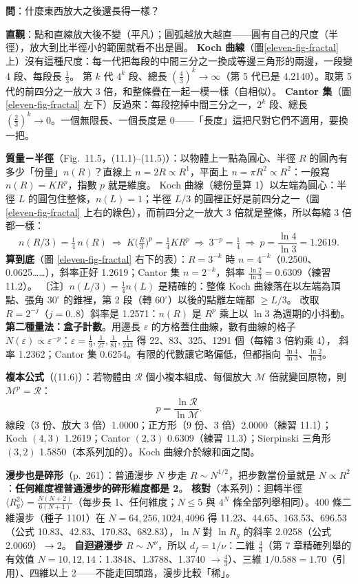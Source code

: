 \textbf{問}：什麼東西放大之後還長得一樣？

\textbf{直觀}：點和直線放大後不變（平凡）；圓弧越放大越直——圓有自己的尺度（半徑），放大到比半徑小的範圍就看不出是圓。
\textbf{Koch 曲線}（圖\ref{eleven-fig-fractal} 上）沒有這種尺度：每一代把每段的中間三分之一換成等邊三角形的兩邊，一段變 4 段、每段長 $\frac13$。
第 $k$ 代 $4^k$ 段、總長 $(\frac43)^k\to\infty$（第 5 代已是 4.2140）。取第 5 代的前四分之一放大 3 倍，和整條疊在一起一模一樣（自相似）。
\textbf{Cantor 集}（圖\ref{eleven-fig-fractal} 左下）反過來：每段挖掉中間三分之一，$2^k$ 段、總長 $(\frac23)^k\to0$。一個無限長、一個長度是 0——「長度」這把尺對它們不適用，要換一把。

\textbf{質量－半徑}（Fig.~11.5，(11.1)--(11.5)）：以物體上一點為圓心、半徑 $R$ 的圓內有多少「份量」$n(R)$？直線上 $n=2R\propto R^1$，平面上 $n=\pi R^2\propto R^2$：一般寫 $n(R)=KR^p$，指數 $p$ 就是維度。
Koch 曲線（總份量算 1）以左端為圓心：半徑 $L$ 的圓包住整條，$n(L)=1$；半徑 $L/3$ 的圓裡正好是前四分之一（圖 \ref{eleven-fig-fractal} 上右的綠色），而前四分之一放大 3 倍就是整條，所以每縮 3 倍都一樣：
\[n(R/3)=\tfrac14\,n(R)\ \Rightarrow\ K\big(\tfrac R3\big)^p=\tfrac14KR^p\ \Rightarrow\ 3^{-p}=\tfrac14\ \Rightarrow\ p=\frac{\ln4}{\ln3}=1.2619 .\tag{11.1--11.5}\]
\textbf{算到底}（圖 \ref{eleven-fig-fractal} 右下的表）：$R=3^{-k}$ 時 $n=4^{-k}$（0.2500、0.0625……），斜率正好 1.2619；Cantor 集 $n=2^{-k}$，斜率 $\frac{\ln2}{\ln3}=0.6309$（練習 11.2）。
〔注〕$n(L/3)=\frac14n(L)$ 是精確的：整條 Koch 曲線落在以左端為頂點、張角 $30^\circ$ 的錐裡，第 2 段（轉 $60^\circ$）以後的點離左端都 $\ge L/3$。
改取 $R=2^{-j}$（$j=0..8$）斜率是 1.2571：$n(R)$ 是 $R^p$ 乘上以 $\ln3$ 為週期的小抖動。
\textbf{第二種量法：盒子計數}。用邊長 $\varepsilon$ 的方格蓋住曲線，數有曲線的格子 $N(\varepsilon)\propto\varepsilon^{-p}$：$\varepsilon=\frac19,\frac1{27},\frac1{81},\frac1{243}$ 得 22、83、325、1291 個（每縮 3 倍約乘 4），
斜率 1.2362；Cantor 集 0.6254。有限的代數讓它略偏低，但都指向 $\frac{\ln4}{\ln3}$、$\frac{\ln2}{\ln3}$。

\textbf{複本公式}（(11.6)）：若物體由 $\mathcal R$ 個小複本組成、每個放大 $\mathcal M$ 倍就變回原物，則 $\mathcal M^p=\mathcal R$：
\[p=\frac{\ln\mathcal R}{\ln\mathcal M}.\tag{11.6}\]
線段（3 份、放大 3 倍）1.0000；正方形（9 份、3 倍）2.0000（練習 11.1）；Koch $(4,3)$ 1.2619；Cantor $(2,3)$ 0.6309（練習 11.3）；Sierpinski 三角形 $(3,2)$ 1.5850（本系列加的）。Koch 曲線介於線和面之間。

\textbf{漫步也是碎形}（p.~261）：普通漫步 $N$ 步走 $R\sim N^{1/2}$，把步數當份量就是 $N\propto R^2$：\textbf{任何維度裡普通漫步的碎形維度都是 2}。
\textbf{核對}（本系列）：迴轉半徑 $\langle R_g^2\rangle=\frac{N(N+2)}{6(N+1)}$（每步長 1、任何維度；$N\le5$ 與 $4^N$ 條全部列舉相同）。400 條二維漫步（種子 1101）在 $N=64,256,1024,4096$ 得
11.23、44.65、163.53、696.53（公式 10.83、42.83、170.83、682.83），$\ln N$ 對 $\ln R_g$ 的斜率 2.0258（公式 2.0069）$\to2$。
\textbf{自迴避漫步} $R\sim N^\nu$，所以 $d_f=1/\nu$：二維 $\frac43$（第 7 章精確列舉的有效值 $N=10,12,14$：1.3848、1.3788、1.3740 $\to\frac43$）、三維 $1/0.588=1.70$（引用）、四維以上 2——不能走回頭路，漫步比較「稀」。

